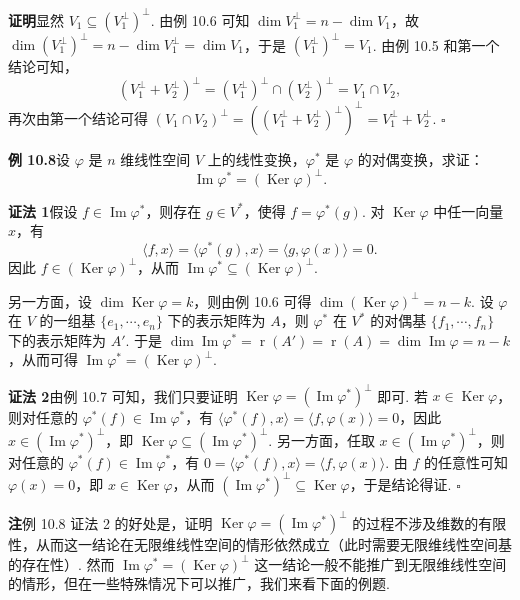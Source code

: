 \documentclass[UTF8,12pt,a4paper,fontset=fandol]{ctexart}
\begin{document}
\noindent\textbf{证明}\quad 显然 $V_1\subseteq (V_1^\perp)^\perp$. 由例 10.6 可知 $\dim V_1^\perp=n-\dim V_1$，故 $\dim (V_1^\perp)^\perp=n-\dim V_1^\perp=\dim V_1$，于是 $(V_1^\perp)^\perp=V_1$. 由例 10.5 和第一个结论可知，
\[
(V_1^\perp+V_2^\perp)^\perp=(V_1^\perp)^\perp\cap (V_2^\perp)^\perp=V_1\cap V_2,
\]
再次由第一个结论可得 $(V_1\cap V_2)^\perp=((V_1^\perp+V_2^\perp)^\perp)^\perp=V_1^\perp+V_2^\perp$. $\square$

\noindent\textbf{例 10.8}\quad 设 $\varphi$ 是 $n$ 维线性空间 $V$ 上的线性变换，$\varphi^*$ 是 $\varphi$ 的对偶变换，求证：
\[
\operatorname{Im}\varphi^*=(\operatorname{Ker}\varphi)^\perp.
\]

\noindent\textbf{证法 1}\quad 假设 $f\in\operatorname{Im}\varphi^*$，则存在 $g\in V^*$，使得 $f=\varphi^*(g)$. 对 $\operatorname{Ker}\varphi$ 中任一向量 $x$，有
\[
\langle f,x\rangle=\langle\varphi^*(g),x\rangle=\langle g,\varphi(x)\rangle=0.
\]
因此 $f\in(\operatorname{Ker}\varphi)^\perp$，从而 $\operatorname{Im}\varphi^*\subseteq(\operatorname{Ker}\varphi)^\perp$.

另一方面，设 $\dim\operatorname{Ker}\varphi=k$，则由例 10.6 可得 $\dim(\operatorname{Ker}\varphi)^\perp=n-k$. 设 $\varphi$ 在 $V$ 的一组基 $\{e_1,\cdots,e_n\}$ 下的表示矩阵为 $A$，则 $\varphi^*$ 在 $V^*$ 的对偶基 $\{f_1,\cdots,f_n\}$ 下的表示矩阵为 $A'$. 于是 $\dim\operatorname{Im}\varphi^*=\operatorname{r}(A')=\operatorname{r}(A)=\dim\operatorname{Im}\varphi=n-k$，从而可得 $\operatorname{Im}\varphi^*=(\operatorname{Ker}\varphi)^\perp$.

\noindent\textbf{证法 2}\quad 由例 10.7 可知，我们只要证明 $\operatorname{Ker}\varphi=(\operatorname{Im}\varphi^*)^\perp$ 即可. 若 $x\in\operatorname{Ker}\varphi$，则对任意的 $\varphi^*(f)\in\operatorname{Im}\varphi^*$，有 $\langle\varphi^*(f),x\rangle=\langle f,\varphi(x)\rangle=0$，因此 $x\in(\operatorname{Im}\varphi^*)^\perp$，即 $\operatorname{Ker}\varphi\subseteq(\operatorname{Im}\varphi^*)^\perp$. 另一方面，任取 $x\in(\operatorname{Im}\varphi^*)^\perp$，则对任意的 $\varphi^*(f)\in\operatorname{Im}\varphi^*$，有 $0=\langle\varphi^*(f),x\rangle=\langle f,\varphi(x)\rangle$. 由 $f$ 的任意性可知 $\varphi(x)=0$，即 $x\in\operatorname{Ker}\varphi$，从而 $(\operatorname{Im}\varphi^*)^\perp\subseteq\operatorname{Ker}\varphi$，于是结论得证. $\square$

\noindent\textbf{注}\quad 例 10.8 证法 2 的好处是，证明 $\operatorname{Ker}\varphi=(\operatorname{Im}\varphi^*)^\perp$ 的过程不涉及维数的有限性，从而这一结论在无限维线性空间的情形依然成立（此时需要无限维线性空间基的存在性）. 然而 $\operatorname{Im}\varphi^*=(\operatorname{Ker}\varphi)^\perp$ 这一结论一般不能推广到无限维线性空间的情形，但在一些特殊情况下可以推广，我们来看下面的例题.
\end{document}
